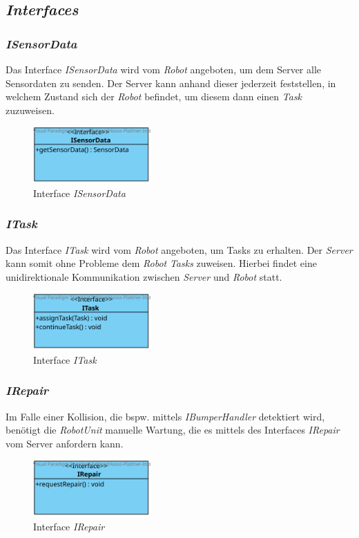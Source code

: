 \subsection{\textit{Interfaces}}
	\subsubsection{\textit{ISensorData}}
	Das Interface \textit{ISensorData} wird vom \textit{Robot} angeboten, um dem Server alle Sensordaten zu senden. 
	Der Server kann anhand dieser jederzeit feststellen, in welchem Zustand sich der \textit{Robot} befindet, um diesem dann einen \textit{Task} zuzuweisen.
	\begin{figure}[H]
	\centering
	\includegraphics[width=0.4\textwidth]{img/1-Entwurf-3-1_ISensorData}
	\caption{Interface \emph{ISensorData}}
	\label{ISensorData}
	\end{figure}

	\subsubsection{\textit{ITask}}
	Das Interface \textit{ITask} wird vom \textit{Robot} angeboten, um Tasks zu erhalten. 
	Der \emph{Server} kann somit ohne Probleme dem \textit{Robot} \textit{Tasks} zuweisen. 
	Hierbei findet eine unidirektionale Kommunikation zwischen \emph{Server} und \emph{Robot} statt.
	\begin{figure}[H]
	\centering
	\includegraphics[width=0.4\textwidth]{img/1-Entwurf-3-1_ITask}
	\caption{Interface \emph{ITask}}
	\label{ITask}
	\end{figure}
	
	\subsubsection{\textit{IRepair}}
	Im Falle einer Kollision, die bspw. mittels \textit{IBumperHandler} detektiert wird, benötigt die \textit{RobotUnit} manuelle Wartung, die es mittels des Interfaces \textit{IRepair} vom Server anfordern kann.
	\begin{figure}[H]
	\centering
	\includegraphics[width=0.4\textwidth]{img/2-Entwurf-3-IRepair}
	\caption{Interface \emph{IRepair}}
	\label{IRepair}
	\end{figure}
		
